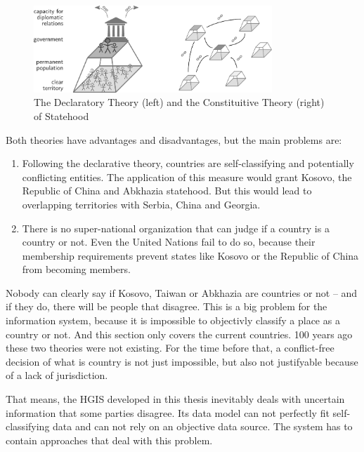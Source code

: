 \begin{figure}[ht]
  \vspace{1em}
  \centering
  \includegraphics[width = 0.8\textwidth]{graphics/basics/countries/decl_const_theory}
  \caption{The Declaratory Theory (left) and the Constituitive Theory (right) of Statehood}
  \label{fig:declaratory_constituitive_theory}
\end{figure}

Both theories have advantages and disadvantages, but the main problems are:
\begin{enumerate}
  \item Following the declarative theory, countries are self-classifying and potentially conflicting entities. The application of this measure would grant Kosovo, the Republic of China and Abkhazia statehood. But this would lead to overlapping territories with Serbia, China and Georgia.
  \item There is no super-national organization that can judge if a country is a country or not. Even the United Nations fail to do so, because their membership requirements prevent states like Kosovo or the Republic of China from becoming members.
\end{enumerate}

Nobody can clearly say if Kosovo, Taiwan or Abkhazia are countries or not -- and if they do, there will be people that disagree. This is a big problem for the information system, because it is impossible to objectivly classify a place as a country or not. And this section only covers the current countries. 100 years ago these two theories were not existing. For the time before that, a conflict-free decision of what is country is not just impossible, but also not justifyable because of a lack of jurisdiction.

That means, the HGIS developed in this thesis inevitably deals with uncertain information that some parties disagree. Its data model can not perfectly fit self-classifying data and can not rely on an objective data source. The system has to contain approaches that deal with this problem.


